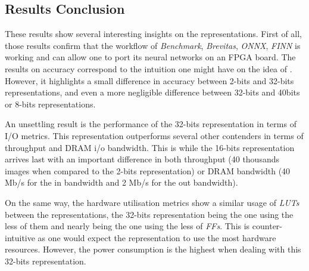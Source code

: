 
\subsection{Results Conclusion}

These results show several interesting insights on the representations. First of all, those results confirm that the workflow of \emph{Benchmark}, \emph{Brevitas}, \emph{ONNX}, \emph{FINN} is working and can allow one to port its neural networks on an FPGA board. The results on accuracy correspond to the intuition one might have on the idea of . However, it highlights a small difference in accuracy between 2-bits and 32-bits representations, and even a more negligible difference between 32-bits and 40bits or 8-bits representations.

An unsettling result is the performance of the 32-bits representation in terms of I/O metrics. This representation outperforms several other contenders in terms of throughput and DRAM i/o bandwidth. This is while the 16-bits representation arrives last with an important difference in both throughput (40 thousands images when compared to the 2-bits representation) or DRAM bandwidth (40 Mb/s for the in bandwidth and 2 Mb/s for the out bandwidth).

On the same way, the hardware utilisation metrics show a similar usage of \emph{LUTs} between the representations, the 32-bits representation being the one using the less of them and nearly being the one using the less of \emph{FFs}. This is counter-intuitive as one would expect the  representation to use the most hardware resources. However, the power consumption is the highest when dealing with this 32-bits representation.
